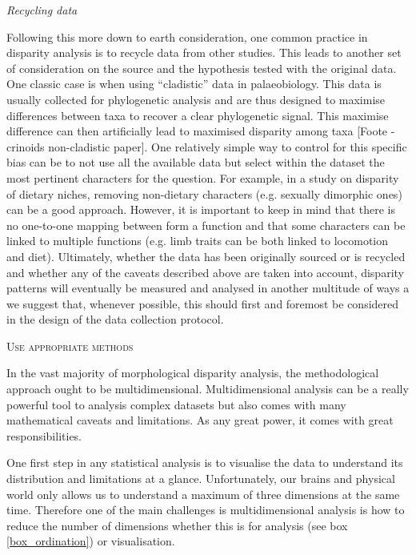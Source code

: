 \documentclass[12pt,letterpaper]{article}
\renewcommand{\section}[1]{%
\bigskip
\begin{center}
\begin{Large}
\normalfont\scshape #1
\medskip
\end{Large}
\end{center}}
\renewcommand{\subsection}[1]{%
\bigskip
\begin{center}
\begin{large}
\normalfont\itshape #1
\end{large}
\end{center}}
\begin{document}
\subsection{Recycling data}
Following this more down to earth consideration, one common practice in disparity analysis is to recycle data from other studies.
This leads to another set of consideration on the source and the hypothesis tested with the original data.
One classic case is when using ``cladistic'' data in palaeobiology.
This data is usually collected for phylogenetic analysis and are thus designed to maximise differences between taxa to recover a clear phylogenetic signal.
This maximise difference can then artificially lead to maximised disparity among taxa [Foote - crinoids non-cladistic paper].
One relatively simple way to control for this specific bias can be to not use all the available data but select within the dataset the most pertinent characters for the question.
For example, in a study on disparity of dietary niches, removing non-dietary characters (e.g. sexually dimorphic ones) can be a good approach.
However, it is important to keep in mind that there is no one-to-one mapping between form a function and that some characters can be linked to multiple functions (e.g. limb traits can be both linked to locomotion and diet).
Ultimately, whether the data has been originally sourced or is recycled and whether any of the caveats described above are taken into account, disparity patterns will eventually be measured and analysed in another multitude of ways a we suggest that, whenever possible, this should first and foremost be considered in the design of the data collection protocol.

\section{Use appropriate methods} 
In the vast majority of morphological disparity analysis, the methodological approach ought to be multidimensional.
Multidimensional analysis can be a really powerful tool to analysis complex datasets but also comes with many mathematical caveats and limitations.
As any great power, it comes with great responsibilities.

One first step in any statistical analysis is to visualise the data to understand its distribution and limitations at a glance.
Unfortunately, our brains and physical world only allows us to understand a maximum of three dimensions at the same time.
Therefore one of the main challenges is multidimensional analysis is how to reduce the number of dimensions whether this is for analysis (see box \ref{box_ordination}) or visualisation.
\end{document}
